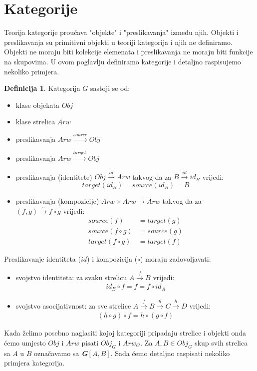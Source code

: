\documentclass[11pt]{article}
\newcommand{\category}[1]{\textbf{\emph{#1}}}
\theoremstyle{definition}
\newtheorem{definition}{Definicija}
\begin{document}
  \section{Kategorije}
  Teorija kategorije proučava "objekte" i "preslikavanja" između
  njih. Objekti i preslikavanja su primitivni objekti u teoriji kategorija i
  njih ne definiramo. Objekti ne moraju biti kolekcije elemenata i
  preslikavanja ne moraju biti funkcije na skupovima.
  U ovom poglavlju definiramo kategorije i detaljno raspisujemo nekoliko
  primjera.
  \begin{definition}
    Kategorija $G$ sastoji se od:
    \begin{itemize}
      \item klase objekata $Obj$
      \item klase strelica $Arw$
      \item preslikavanja $Arw \xrightarrow{source} Obj$
      \item preslikavanja $Arw \xrightarrow{target} Obj$
      \item preslikavanja (identitete) $Obj \xrightarrow{id} Arw$ takvog da
      za $B \xrightarrow{id} id_B$ vrijedi:
        \begin{equation}
          target(id_B) = source(id_B) = B
        \end{equation}
      \item preslikavanja (kompozicije) $Arw \times Arw \xrightarrow{\circ}
      Arw$ takvog da za \\ $(f, g) \xrightarrow{\circ} f \circ g$ vrijedi:
        \begin{align}
          source(f) &= target(g) \\
          source(f \circ g) &= source(g) \\
          target(f \circ g) &= target(f)
        \end{align}
    \end{itemize}
    Preslikavanje identiteta ($id$) i kompozicija ($\circ$) moraju
    zadovoljavati:
    \begin{itemize}
      \item svojstvo identiteta: za svaku strelicu $A \xrightarrow{f} B$ vrijedi:
        \begin{align}
          id_B \circ f = f = f \circ id_A
        \end{align}
      \item svojstvo asocijativnost: za sve strelice $A \xrightarrow{f} B
      \xrightarrow{g} C \xrightarrow{h} D$ vrijedi:
        \begin{align} \label{def:kat_assoc}
          (h \circ g) \circ f = h \circ (g \circ f)
        \end{align}
    \end{itemize}
  \end{definition}
  Kada želimo posebno naglasiti kojoj kategoriji pripadaju strelice i objekti
  onda ćemo umjesto $Obj$ i $Arw$ pisati $Obj_G$ i $Arw_G$.
  Za $A, B \in Obj_G$ skup svih strelica sa $A$ u $B$ označavamo sa
  \category{G}$[A, B]$.
  Sada ćemo detaljno raspisati nekoliko primjera kategorija.
\end{document}
